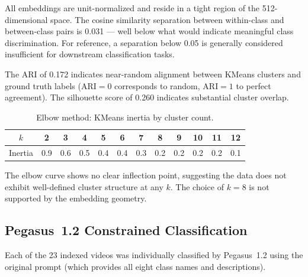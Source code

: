 \documentclass[11pt,a4paper]{article}
\begin{document}
All embeddings are unit-normalized and reside in a tight region of the 512-dimensional space. The cosine similarity separation between within-class and between-class pairs is 0.031 --- well below what would indicate meaningful class discrimination. For reference, a separation below 0.05 is generally considered insufficient for downstream classification tasks.

The ARI of 0.172 indicates near-random alignment between KMeans clusters and ground truth labels ($\text{ARI}{=}0$ corresponds to random, $\text{ARI}{=}1$ to perfect agreement). The silhouette score of 0.260 indicates substantial cluster overlap.

\begin{table}[H]
\centering
\caption{Elbow method: KMeans inertia by cluster count.}
\label{tab:elbow}
\begin{tabular}{@{}cccccccccccc@{}}
\toprule
$k$ & 2 & 3 & 4 & 5 & 6 & 7 & 8 & 9 & 10 & 11 & 12 \\
\midrule
Inertia & 0.9 & 0.6 & 0.5 & 0.4 & 0.4 & 0.3 & 0.2 & 0.2 & 0.2 & 0.2 & 0.1 \\
\bottomrule
\end{tabular}
\end{table}

The elbow curve shows no clear inflection point, suggesting the data does not exhibit well-defined cluster structure at any $k$. The choice of $k{=}8$ is not supported by the embedding geometry.

\subsection{Pegasus~1.2 Constrained Classification}

Each of the 23 indexed videos was individually classified by Pegasus~1.2 using the original prompt (which provides all eight class names and descriptions).
\end{document}
